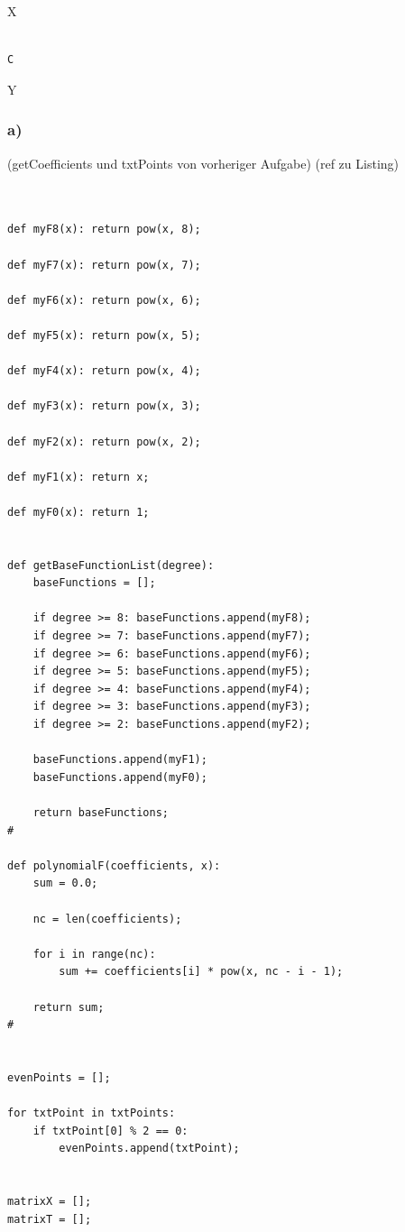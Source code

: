 X

\begin{lstlisting}[caption=todo]

C

\end{lstlisting}

Y


\subsubsection{a)}

(getCoefficients und txtPoints von vorheriger Aufgabe) (ref zu Listing)

\begin{lstlisting}[caption=todo]


def myF8(x): return pow(x, 8);

def myF7(x): return pow(x, 7);

def myF6(x): return pow(x, 6);

def myF5(x): return pow(x, 5);

def myF4(x): return pow(x, 4);

def myF3(x): return pow(x, 3);

def myF2(x): return pow(x, 2);

def myF1(x): return x;

def myF0(x): return 1;


def getBaseFunctionList(degree):
	baseFunctions = [];
	
	if degree >= 8: baseFunctions.append(myF8);
	if degree >= 7: baseFunctions.append(myF7);
	if degree >= 6: baseFunctions.append(myF6);
	if degree >= 5: baseFunctions.append(myF5);
	if degree >= 4: baseFunctions.append(myF4);
	if degree >= 3: baseFunctions.append(myF3);
	if degree >= 2: baseFunctions.append(myF2);
	
	baseFunctions.append(myF1);
	baseFunctions.append(myF0);
	
	return baseFunctions;
#

def polynomialF(coefficients, x):
	sum = 0.0;
	
	nc = len(coefficients);
	
	for i in range(nc):
		sum += coefficients[i] * pow(x, nc - i - 1);
	
	return sum;
#


evenPoints = [];

for txtPoint in txtPoints:
	if txtPoint[0] % 2 == 0:
		evenPoints.append(txtPoint);


matrixX = [];
matrixT = [];


\end{lstlisting}
